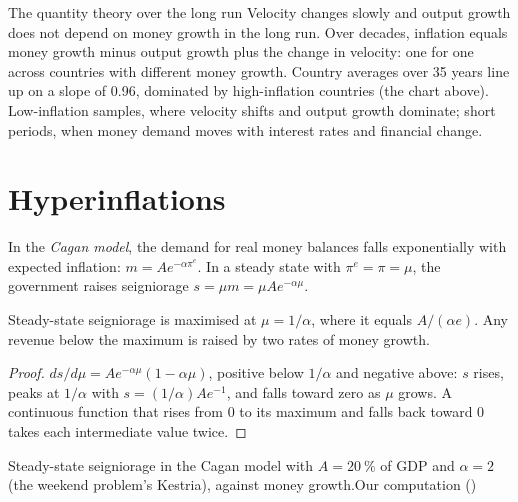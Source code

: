 \begin{model}{The quantity theory over the long run}
\assumes Velocity changes slowly and output growth does not depend on money
growth in the long run.
\predicts Over decades, inflation equals money growth minus output growth plus the
change in velocity: one for one across countries with different money growth.
\tested Country averages over 35 years line up on a slope of 0.96, dominated by
high-inflation countries (the chart above).
\breaks Low-inflation samples, where velocity shifts and output growth dominate;
short periods, when money demand moves with interest rates and financial change.
\end{model}

\section{Hyperinflations}\label{sec:b3:inflation-evidence:hyper}

\begin{definition}\label{def:b3:inflation-evidence:cagan}
In the \emph{Cagan model}, the demand for real money balances falls exponentially
with expected inflation: $m = Ae^{-\alpha\pi^e}$. In a steady state with $\pi^e = \pi = \mu$, the government
raises seigniorage $s = \mu m = \mu Ae^{-\alpha\mu}$.
\end{definition}

\begin{proposition}\label{prop:b3:inflation-evidence:laffer}
Steady-state seigniorage is maximised at $\mu = 1/\alpha$, where it equals $A/(\alpha e)$. Any revenue
below the maximum is raised by two rates of money growth.
\end{proposition}

\begin{proof}
$ds/d\mu = Ae^{-\alpha\mu}(1 - \alpha\mu)$, positive below $1/\alpha$ and negative above: $s$ rises, peaks at $1/\alpha$ with
$s = (1/\alpha)Ae^{-1}$, and falls toward zero as $\mu$ grows. A continuous function that rises
from 0 to its maximum and falls back toward 0 takes each intermediate value twice.
\end{proof}

\begin{omchart}{Steady-state seigniorage in the Cagan model with $A = 20~\%$ of GDP and
$\alpha = 2$ (the weekend problem's Kestria), against money growth.}{Our computation
()}
\end{omchart}

